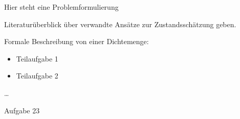\documentclass [a4paper, 10pt]{scrartcl}
\begin{document}
\Anfang

Hier steht eine Problemformulierung

\begin{aufgaben}
\item Literaturüberblick über verwandte Ansätze zur Zustandsschätzung geben.
\item Formale Beschreibung von einer Dichtemenge:
  \begin{itemize}
  \item Teilaufgabe 1
  \item Teilaufgabe 2
  \end{itemize}
\item \ldots
\item Aufgabe 23
\end{aufgaben}%
\Ende
\end{document}
